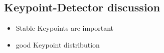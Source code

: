\subsection{Keypoint-Detector discussion}

\begin{itemize}
    \item Stable Keypoints are important
    \item good Keypoint distribution
\end{itemize}
